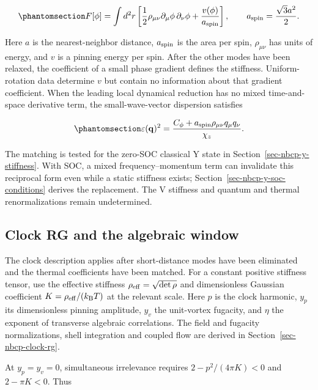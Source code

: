 \begin{equation}\phantomsection\label{eq-nbcp-continuum-energy}{
F[\phi]=\int d^2r\left[
\frac12\rho_{\mu\nu}\partial_\mu\phi\,\partial_\nu\phi
+\frac{v(\phi)}{a_{\rm spin}}\right],
\qquad a_{\rm spin}=\frac{\sqrt3a^2}{2}.
}\end{equation}

Here \(a\) is the nearest-neighbor distance, \(a_{\rm spin}\) is the
area per spin, \(\rho_{\mu\nu}\) has units of energy, and \(v\) is a
pinning energy per spin. After the other modes have been relaxed, the
coefficient of a small phase gradient defines the stiffness.
Uniform-rotation data determine \(v\) but contain no information about
that gradient coefficient. When the leading local dynamical reduction
has no mixed time-and-space derivative term, the small-wave-vector
dispersion satisfies

\begin{equation}\phantomsection\label{eq-nbcp-phase-dispersion}{
\varepsilon(\mathbf q)^2=
\frac{C_\phi+a_{\rm spin}\rho_{\mu\nu}q_\mu q_\nu}{\chi_z}.
}\end{equation}

The matching is tested for the zero-SOC classical Y state in
Section~\ref{sec-nbcp-y-stiffness}. With SOC, a mixed
frequency--momentum term can invalidate this reciprocal form even while
a static stiffness exists; Section~\ref{sec-nbcp-y-soc-conditions}
derives the replacement. The V stiffness and quantum and thermal
renormalizations remain undetermined.

\subsection{Clock RG and the algebraic window}\label{sec-nbcp-clock}

The clock description applies after short-distance modes have been
eliminated and the thermal coefficients have been matched. For a
constant positive stiffness tensor, use the effective stiffness
\(\rho_{\rm eff}=\sqrt{\det\rho}\) and dimensionless Gaussian
coefficient \(K=\rho_{\rm eff}/(k_{\rm B}T)\) at the relevant scale.
Here \(p\) is the clock harmonic, \(y_p\) its dimensionless pinning
amplitude, \(y_v\) the unit-vortex fugacity, and \(\eta\) the exponent
of transverse algebraic correlations. The field and fugacity
normalizations, shell integration and coupled flow are derived in
Section~\ref{sec-nbcp-clock-rg}.

At \(y_p=y_v=0\), simultaneous irrelevance requires \(2-p^2/(4\pi K)<0\)
and \(2-\pi K<0\). Thus

